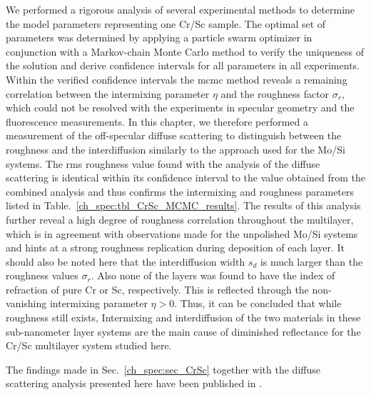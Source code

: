 We performed a rigorous analysis of several experimental methods to determine 
the model parameters representing one Cr/Sc sample. The optimal set of 
parameters was determined by applying a particle swarm optimizer in conjunction 
with a Markov-chain Monte Carlo method to verify the uniqueness of the solution 
and derive confidence intervals for all parameters in all experiments. Within the verified confidence intervals the \gls{mcmc} method reveals a remaining 
correlation between the intermixing parameter $\eta$ and the roughness factor $\sigma_r$, which 
could not be resolved with the experiments in specular geometry and the fluorescence measurements. In this chapter, we therefore 
performed a measurement of the off-specular diffuse scattering to distinguish 
between the roughness and the interdiffusion similarly to the approach used for the Mo/Si systems. The \gls{rms} roughness value found with the analysis of the diffuse scattering is identical within its confidence interval to the value obtained from the combined analysis and thus confirms the intermixing and roughness parameters listed in Table.~\ref{ch_spec:tbl_CrSc_MCMC_results}. The results of this analysis further reveal a high degree of roughness correlation throughout the multilayer, which is in agreement with observations made for the unpolished Mo/Si systems and hints at a strong roughness replication during deposition of each layer. It should also be noted here that the interdiffusion width 
$s_d$ is much larger than the roughness values $\sigma_r$. Also none of the 
layers was found to have the index of refraction of pure Cr or Sc, 
respectively. This is reflected through the non-vanishing intermixing parameter 
$\eta>0$. Thus, it can be concluded that while roughness still exists, 
Intermixing and interdiffusion of the two materials in these sub-nanometer layer systems are the main cause of diminished reflectance for the Cr/Sc multilayer system studied here.

The findings made in Sec.~\ref{ch_spec:sec_CrSc} together with the diffuse scattering analysis presented here have been published in .
